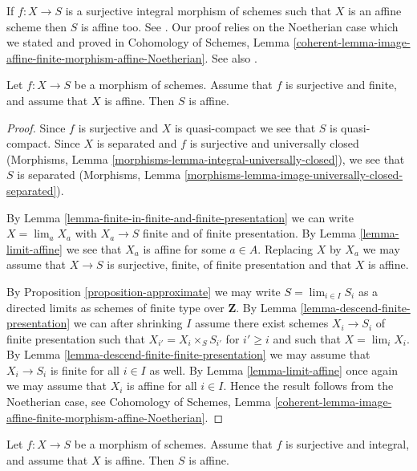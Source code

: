\noindent
If $f : X \to S$ is a surjective integral morphism of schemes
such that $X$ is an affine scheme then $S$ is affine too.
See \cite[A.2]{Conrad-Nagata}. Our proof relies
on the Noetherian case which we stated and proved in Cohomology of Schemes,
Lemma \ref{coherent-lemma-image-affine-finite-morphism-affine-Noetherian}.
See also \cite[II 6.7.1]{EGA}.

\begin{lemma}
\label{lemma-affine}
Let $f : X \to S$ be a morphism of schemes.
Assume that $f$ is surjective and finite, and assume that $X$ is affine.
Then $S$ is affine.
\end{lemma}

\begin{proof}
Since $f$ is surjective and $X$ is quasi-compact we see that $S$ is
quasi-compact. Since $X$ is separated and $f$ is surjective and
universally closed (Morphisms, Lemma
\ref{morphisms-lemma-integral-universally-closed}), we see that $S$
is separated (Morphisms, Lemma
\ref{morphisms-lemma-image-universally-closed-separated}).

\medskip\noindent
By Lemma \ref{lemma-finite-in-finite-and-finite-presentation}
we can write $X = \lim_a X_a$ with $X_a \to S$ finite and of finite
presentation. By Lemma \ref{lemma-limit-affine} we see that $X_a$
is affine for some $a \in A$. Replacing $X$ by $X_a$ we may assume
that $X \to S$ is surjective, finite, of finite presentation and
that $X$ is affine.

\medskip\noindent
By Proposition \ref{proposition-approximate} we may write
$S = \lim_{i \in I} S_i$ as
a directed limits as schemes of finite type over $\mathbf{Z}$.
By Lemma \ref{lemma-descend-finite-presentation} we can
after shrinking $I$ assume there exist schemes $X_i \to S_i$
of finite presentation such that $X_{i'} = X_i \times_S S_{i'}$
for $i' \geq i$ and such that $X = \lim_i X_i$. By
Lemma \ref{lemma-descend-finite-finite-presentation} we may
assume that $X_i \to S_i$ is finite for all $i \in I$ as well.
By Lemma \ref{lemma-limit-affine} once again we may assume that $X_i$ is
affine for all $i \in I$. Hence the result follows from the
Noetherian case, see Cohomology of Schemes,
Lemma \ref{coherent-lemma-image-affine-finite-morphism-affine-Noetherian}.
\end{proof}

\begin{proposition}
\label{proposition-affine}
Let $f : X \to S$ be a morphism of schemes.
Assume that $f$ is surjective and integral, and assume that $X$ is affine.
Then $S$ is affine.
\end{proposition}

